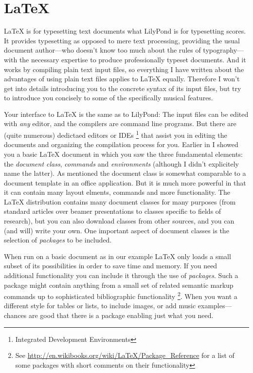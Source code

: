 \documentclass[DIV=12]{scrreprt}
\begin{document}
\chapter{\LaTeX}
\label{chap:pt_latex}

\LaTeX{} is for typesetting text documents what LilyPond is for typesetting scores.
It provides typesetting as opposed to mere text processing, providing the usual document author---who doesn't know too much about the rules of typography---with the necessary expertise to produce professionally typeset documents.
And it works by compiling plain text input files, so everything I have written about the advantages of using plain text files applies to \LaTeX{} equally.
Therefore I won't get into details introducing you to the concrete syntax of its input files, but try to introduce you concisely to some of the specifically musical features.

Your interface to \LaTeX{} is the same as to LilyPond:
The input files can be edited with \emph{any} editor, and the compilers are command line programs.
But there are (quite numerous) dedictaed editors or IDEs%
\footnote{Integrated Development Environments}
that assist you in editing the documents and organizing the compilation process for you.
Earlier in  I showed you a basic \LaTeX{} document in which you saw the three fundamental elements: the \emph{document class}, \emph{commands} and \emph{environments} (although I didn't explicitely name the latter).
As mentioned the document class is somewhat comparable to a document template in an office application.
But it is much more powerful in that it can contain many layout elments, commands and more functionality.
The LaTeX{} distribution contains many document classes for many purposes (from standard articles over beamer presentations to classes specific to fields of research), but you can also download classes from other sources, and you can (and will) write your own.
One important aspect of document classes is the selection of \emph{packages} to be included.

When run on a basic document as in our example \LaTeX{} only loads a small subset of its possibilities in order to save time and memory.
If you need additional functionality you can include it through the use of \emph{packages}.
Such a package might contain anything from a small set of related semantic markup commands up to sophisticated bibliographic functionality%
\footnote{See \url{http://en.wikibooks.org/wiki/LaTeX/Package_Reference} for a list of some packages with short comments on their functionality}.
When you want a different style for tables or lists, to include images, or add music examples---chances are good that there is a package enabling just what you need.
\end{document}
